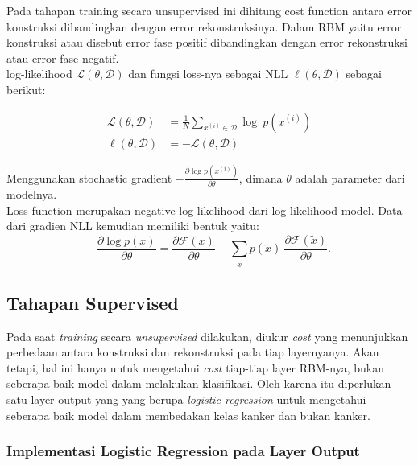 Pada tahapan training secara unsupervised ini dihitung cost function antara error konstruksi dibandingkan dengan error rekonstruksinya. Dalam RBM yaitu error konstruksi atau disebut error fase positif dibandingkan dengan error rekonstruksi atau error fase negatif.\\
log-likelihood $\mathcal{L}(\theta, \mathcal{D})$ dan fungsi loss-nya sebagai NLL $\ell (\theta, \mathcal{D})$ sebagai berikut:

\begin{equation}
\begin{aligned}
\mathcal{L}(\theta, \mathcal{D}) &= \frac{1}{N} \sum_{x^{(i)} \in
\mathcal{D}} \log\ p(x^{(i)}) \\
\ell (\theta, \mathcal{D}) &= - \mathcal{L} (\theta, \mathcal{D})
\end{aligned}
\end{equation}


Menggunakan stochastic gradient $-\frac{\partial  \log p(x^{(i)})}{\partial
\theta}$, dimana $\theta$ adalah parameter dari modelnya.\\
Loss function merupakan negative log-likelihood dari log-likelihood model. Data dari gradien NLL kemudian memiliki bentuk yaitu:
\begin{equation}
- \frac{\partial  \log p(x)}{\partial \theta}
 = \frac{\partial \mathcal{F}(x)}{\partial \theta} -
       \sum_{\tilde{x}} p(\tilde{x}) \
           \frac{\partial \mathcal{F}(\tilde{x})}{\partial \theta}.
\end{equation}


\subsection{Tahapan Supervised}
Pada saat \textit{training}  secara \textit{unsupervised} dilakukan, diukur \textit{cost} yang menunjukkan perbedaan antara konstruksi dan rekonstruksi pada tiap layernyanya. Akan tetapi, hal ini hanya untuk mengetahui \textit{cost} tiap-tiap layer RBM-nya, bukan seberapa baik model dalam melakukan klasifikasi. Oleh karena itu diperlukan satu layer output yang yang berupa \textit{logistic regression} untuk mengetahui seberapa baik model dalam membedakan kelas kanker dan bukan kanker.

\subsubsection{Implementasi Logistic Regression pada Layer Output}

